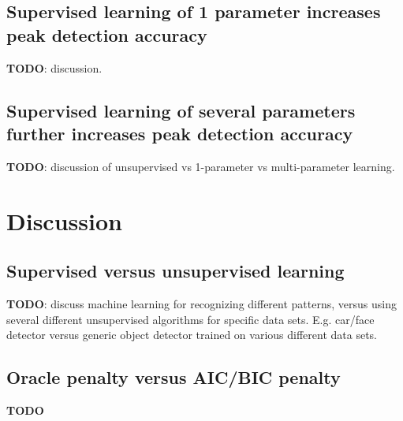 \documentclass{article}
\begin{document}
\subsection{Supervised learning of 1 parameter increases peak
  detection accuracy}

\textbf{TODO}: discussion.

\subsection{Supervised learning of several parameters further 
  increases peak detection accuracy}

\textbf{TODO}: discussion of unsupervised vs 1-parameter vs multi-parameter
learning.

%   

\section{Discussion}
\label{sec:discussion}

\subsection{Supervised versus unsupervised learning}

\textbf{TODO}: discuss machine learning for recognizing different
patterns, versus using several different unsupervised algorithms for
specific data sets. E.g. car/face detector versus generic object
detector trained on various different data sets.

\subsection{Oracle penalty versus AIC/BIC penalty}

\textbf{TODO}


\end{document}
